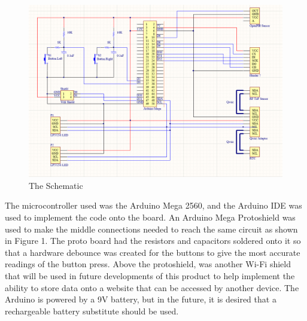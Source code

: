 \documentclass{article}
\begin{document}
\begin{figure} [h]
	\begin{center}
		\caption {The Schematic} \label{fig:schematic}
		\includegraphics[width=\textwidth]{./images/schematic.png}
	\end{center}
\end{figure}

The microcontroller used was the Arduino Mega 2560, and the Arduino IDE was used to implement the code onto the board. An Arduino Mega Protoshield was used to make the middle connections needed to reach the same circuit as shown in Figure 1. The proto board had the resistors and capacitors soldered onto it so that a hardware debounce was created for the buttons to give the most accurate readings of the button press. Above the protoshield, was another Wi-Fi shield that will be used in future developments of this product to help implement the ability to store data onto a website that can be accessed by another device. The Arduino is powered by a 9V battery, but in the future, it is desired that a rechargeable battery substitute should be used.
 
\end{document}
